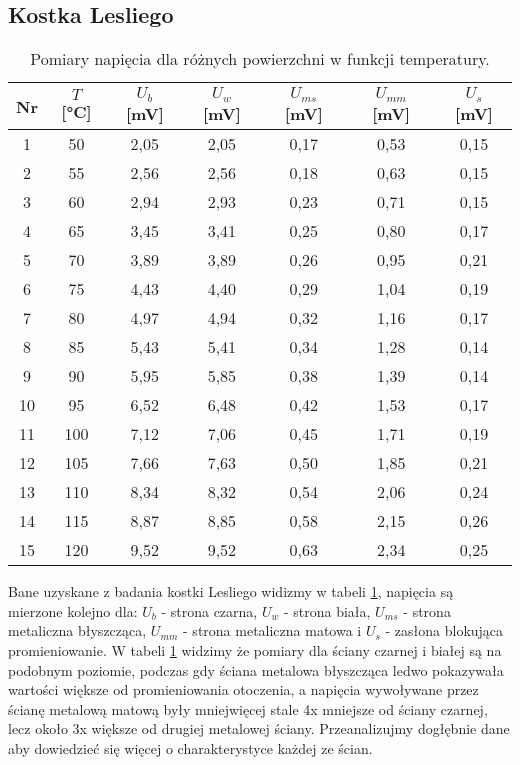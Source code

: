 \documentclass[12pt]{article}
\begin{document}
\subsection{Kostka Lesliego}
\begin{table}[H]
    \centering
    \begin{tabular}{c|c|cccc|c}
        \toprule
        Nr & $T$ [°C] & $U_b$ [mV] & $U_w$ [mV] & $U_{ms}$ [mV] & $U_{mm}$ [mV] & $U_s$ [mV] \\
        \midrule
        1  & 50  & 2{,}05 & 2{,}05 & 0{,}17 & 0{,}53 & 0{,}15 \\
        2  & 55  & 2{,}56 & 2{,}56 & 0{,}18 & 0{,}63 & 0{,}15 \\
        3  & 60  & 2{,}94 & 2{,}93 & 0{,}23 & 0{,}71 & 0{,}15 \\
        4  & 65  & 3{,}45 & 3{,}41 & 0{,}25 & 0{,}80 & 0{,}17 \\
        5  & 70  & 3{,}89 & 3{,}89 & 0{,}26 & 0{,}95 & 0{,}21 \\
        6  & 75  & 4{,}43 & 4{,}40 & 0{,}29 & 1{,}04 & 0{,}19 \\
        7  & 80  & 4{,}97 & 4{,}94 & 0{,}32 & 1{,}16 & 0{,}17 \\
        8  & 85  & 5{,}43 & 5{,}41 & 0{,}34 & 1{,}28 & 0{,}14 \\
        9  & 90  & 5{,}95 & 5{,}85 & 0{,}38 & 1{,}39 & 0{,}14 \\
        10 & 95  & 6{,}52 & 6{,}48 & 0{,}42 & 1{,}53 & 0{,}17 \\
        11 & 100 & 7{,}12 & 7{,}06 & 0{,}45 & 1{,}71 & 0{,}19 \\
        12 & 105 & 7{,}66 & 7{,}63 & 0{,}50 & 1{,}85 & 0{,}21 \\
        13 & 110 & 8{,}34 & 8{,}32 & 0{,}54 & 2{,}06 & 0{,}24 \\
        14 & 115 & 8{,}87 & 8{,}85 & 0{,}58 & 2{,}15 & 0{,}26 \\
        15 & 120 & 9{,}52 & 9{,}52 & 0{,}63 & 2{,}34 & 0{,}25 \\
        \bottomrule
    \end{tabular}
    \caption{Pomiary napięcia dla różnych powierzchni w funkcji temperatury.}
    \label{tab:cube_measurements}
\end{table}
Bane uzyskane z badania kostki Lesliego widizmy w tabeli \ref{tab:cube_measurements}, napięcia są mierzone kolejno dla: $U_b$ - strona czarna, $U_w$ - strona biała, $U_{ms}$ - strona metaliczna błyszcząca, $U_{mm}$ - strona metaliczna matowa i $U_s$ - zasłona blokująca promieniowanie.
W tabeli \ref{tab:cube_measurements} widzimy że pomiary dla ściany czarnej i białej są na podobnym poziomie, podczas gdy ściana metalowa błyszcząca ledwo pokazywała wartości większe od promieniowania otoczenia, 
a napięcia wywoływane przez ścianę metalową matową były mniejwięcej stale 4x mniejsze od ściany czarnej, lecz około 3x większe od drugiej metalowej ściany.
Przeanalizujmy dogłębnie dane aby dowiedzieć się więcej o charakterystyce każdej ze ścian.
\end{document}
